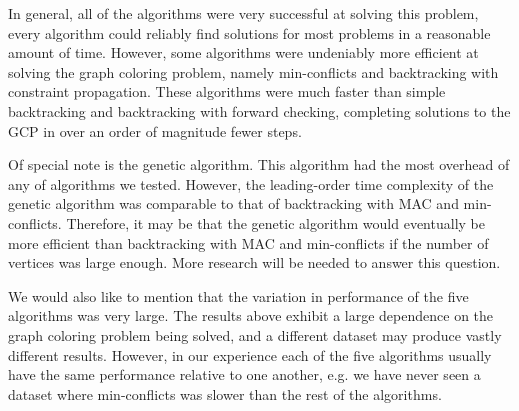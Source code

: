 \documentclass{article}
\begin{document}
	
	In general, all of the algorithms were very successful at solving this problem, every algorithm could reliably find solutions for most problems in a reasonable amount of time. However, some algorithms were undeniably more efficient at solving the graph coloring problem, namely min-conflicts and backtracking with constraint propagation. These algorithms were much faster than simple backtracking and backtracking with forward checking, completing solutions to the GCP in over an order of magnitude fewer steps.
	
	Of special note is the genetic algorithm. This algorithm had the most overhead of any of algorithms we tested. However, the leading-order time complexity of the genetic algorithm was comparable to that of backtracking with MAC and min-conflicts. Therefore, it may be that the genetic algorithm would eventually be more efficient than backtracking with MAC and min-conflicts if the number of vertices was large enough. More research will be needed to answer this question.
	
	We would also like to mention that the variation in performance of the five algorithms was very large. The results above exhibit a large dependence on the graph coloring problem being solved, and a different dataset may produce vastly different results. However, in our experience each of the five algorithms usually have the same performance relative to one another, e.g. we have never seen a dataset where min-conflicts was slower than the rest of the algorithms.

	




	
	
	
\end{document}

